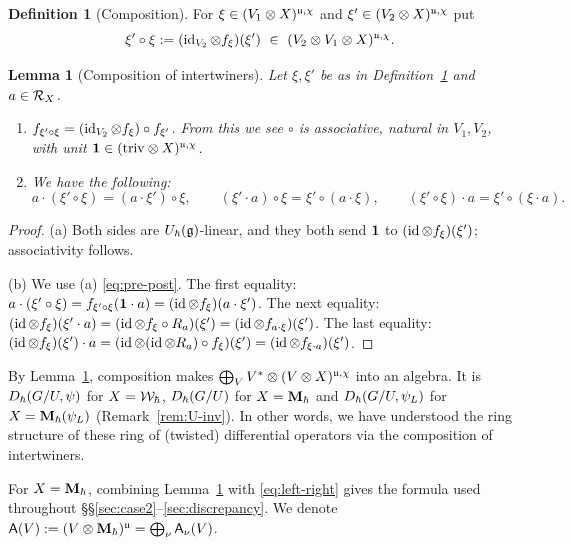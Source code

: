 \documentclass{article}
\theoremstyle{plain}
\newtheorem{lemma}[theorem]{Lemma}
\theoremstyle{definition}
\newtheorem{definition}[theorem]{Definition}
\theoremstyle{remark}
\numberwithin{equation}{section}
\begin{document}
\begin{definition}[Composition]\label{def:composition}
For $\xi\in(V_1\otimes X)^{\mathfrak{u},\chi}$ and $\xi'\in(V_2\otimes X)^{\mathfrak{u},\chi}$ put
\[
\xi'\circ\xi:=(\operatorname{id}_{V_2}\otimes f_\xi)(\xi')\ \in\ (V_2\otimes V_1\otimes X)^{\mathfrak{u},\chi}.
\]
\end{definition}

\begin{lemma}[Composition of intertwiners]\label{lem:composition}
Let $\xi,\xi'$ be as in Definition~\ref{def:composition} and $a\in\mathcal R_X$.
\begin{enumerate}[label=(\alph*)]
\item $f_{\xi'\circ\xi}=(\operatorname{id}_{V_2}\otimes f_\xi)\circ f_{\xi'}$. From this we see $\circ$ is associative, natural in $V_1,V_2$, with unit $\mathbf 1\in(\mathrm{triv}\otimes X)^{\mathfrak{u},\chi}$.
\item We have the following:
\[
a\cdot(\xi'\circ\xi)=(a\cdot\xi')\circ\xi,\qquad(\xi'\cdot a)\circ\xi=\xi'\circ(a\cdot\xi),\qquad(\xi'\circ\xi)\cdot a=\xi'\circ(\xi\cdot a).
\]
\end{enumerate}
\end{lemma}

\begin{proof}
(a) Both sides are $U_\hbar(\mathfrak{g})$-linear, and they both send $\mathbf 1$ to $(\operatorname{id}\otimes f_\xi)(\xi')$; associativity follows. 

(b) We use (a) \eqref{eq:pre-post}. The first equality: $a\cdot(\xi'\circ\xi)=f_{\xi'\circ\xi}(\mathbf 1\cdot a)=(\operatorname{id}\otimes f_\xi)(a\cdot\xi')$. The next equality: $(\operatorname{id}\otimes f_\xi)(\xi'\cdot a)=(\operatorname{id}\otimes f_\xi\circ R_a)(\xi')=(\operatorname{id}\otimes f_{a\cdot\xi})(\xi')$. The last equality: $(\operatorname{id}\otimes f_\xi)(\xi')\cdot a=(\operatorname{id}\otimes(\operatorname{id}\otimes R_a)\circ f_\xi)(\xi')=(\operatorname{id}\otimes f_{\xi\cdot a})(\xi')$.
\end{proof}

By Lemma~\ref{lem:composition}, composition makes $\bigoplus_V V^*\otimes(V\otimes X)^{\mathfrak{u},\chi}$ into an algebra. It is $D_\hbar(G/U,\psi)$ for $X=\mathcal{W}_\hbar$, $D_\hbar(G/U)$ for $X=\mathbf{M}_\hbar$ and $D_\hbar(G/U,\psi_L)$ for $X=\mathbf{M}_\hbar(\psi_L)$ (Remark~\ref{rem:U-inv}). In other words, we have understood the ring structure of these ring of (twisted) differential operators via the composition of intertwiners.

For $X=\mathbf{M}_\hbar$, combining Lemma~\ref{lem:composition} with \eqref{eq:left-right} gives the formula used throughout \S\S\ref{sec:case2}--\ref{sec:discrepancy}. We denote $\mathsf A(V):=(V\otimes\mathbf{M}_\hbar)^{\mathfrak{u}}=\bigoplus_\nu\mathsf A_\nu(V)$.
\end{document}

